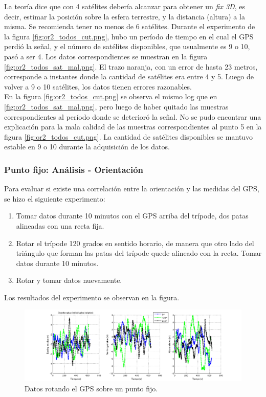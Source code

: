 \documentclass[main]{subfiles}
\begin{document}
La teoría dice que con 4 satélites debería alcanzar para obtener un \textit{fix 3D}, es decir, estimar la posición sobre la esfera terrestre, y la distancia (altura) a la misma. Se recomienda tener no menos de 6 sat\'elites. Durante el experimento de la figura \ref{fig:or2_todos_cut.png}, hubo un per\'iodo de tiempo en el cual el GPS perdió la se\~nal, y el número de satélites disponibles, que usualmente es 9 o 10, pasó a ser 4. Los datos correspondientes se muestran en la figura \ref{fig:or2_todos_sat_mal.png}. El trazo naranja, con un error de hasta 23 metros, corresponde a instantes donde la cantidad de satélites era entre 4 y 5. Luego de volver a 9 o 10 satélites, los datos tienen errores razonables.\\



En la figura \ref{fig:or2_todos_cut.png} se observa el mismo log que en \ref{fig:or2_todos_sat_mal.png}, pero luego de haber quitado las muestras correspondientes al período donde se deterioró la se\~nal. No se pudo encontrar una explicación para la mala calidad de las muestras correspondientes al punto 5 en la figura \ref{fig:or2_todos_cut.png}. La cantidad de satélites disponibles se mantuvo estable en 9 o 10 durante la adquisición de los datos.

\subsubsection{Punto fijo: Análisis - \textbf{Orientación}}
\label{sec:gps-orientacion}

Para evaluar si existe una correlación entre la orientación y las medidas del GPS, se hizo el siguiente experimento:
\begin{enumerate}
\item Tomar datos durante 10 minutos con el GPS arriba del trípode, dos patas alineadas con una recta fija.
\item Rotar el trípode 120 grados en sentido horario, de manera que otro lado del triángulo que forman las patas del trípode quede alineado con la recta. Tomar datos durante 10 minutos.
\item Rotar y tomar datos nuevamente.
\end{enumerate}

Los resultados del experimento se observan en la figura.

\begin{figure}[h!]
\hspace{-70pt}
  \includegraphics[width=1.2\textwidth]{./pics_gps/orientacion_individual.png}
  \caption{Datos rotando el GPS sobre un punto fijo.}
  \label{fig:orientacion_individual.png}
\end{figure}
\end{document}
